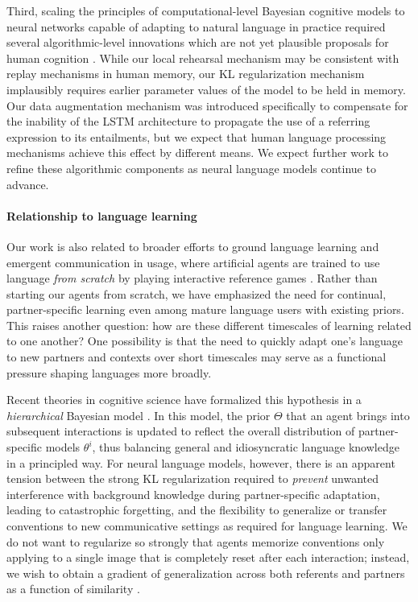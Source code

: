 \documentclass[11pt,a4paper]{article}
\begin{document}
Third, scaling the principles of computational-level Bayesian cognitive models to neural networks capable of adapting to natural language in practice required several algorithmic-level innovations which are not yet plausible proposals for human cognition \cite{marr2010vision}. 
While our local rehearsal mechanism may be consistent with replay mechanisms in human memory, our KL regularization mechanism implausibly requires earlier parameter values of the model to be held in memory.
Our data augmentation mechanism was introduced specifically to compensate for the inability of the LSTM architecture to propagate the use of a referring expression to its entailments, but we expect that human language processing mechanisms achieve this effect by different means.
We expect further work to refine these algorithmic components as neural language models continue to advance.

\paragraph{Relationship to language learning}

Our work is also related to broader efforts to ground language learning and emergent communication in usage, where artificial agents are trained to use language \emph{from scratch} by playing interactive reference games \cite{wang2016learning,lazaridou2016multi,wang2017naturalizing,chevalier2018babyai}. 
Rather than starting our agents from scratch, we have emphasized the need for continual, partner-specific learning even among mature language users with existing priors.
This raises another question: how are these different timescales of learning related to one another?
One possibility is that the need to quickly adapt one's language to new partners and contexts over short timescales may serve as a functional pressure shaping languages more broadly.

Recent theories in cognitive science have formalized this hypothesis in a \emph{hierarchical} Bayesian model \cite{hawkins2020generalizing}.
In this model, the prior $\Theta$ that an agent brings into subsequent interactions is updated to reflect the overall distribution of partner-specific models $\theta^i$, thus balancing general and idiosyncratic language knowledge in a principled way.
For neural language models, however, there is an apparent tension between the strong KL regularization required to \emph{prevent} unwanted interference with background knowledge during partner-specific adaptation, leading to catastrophic forgetting, and the flexibility to generalize or transfer conventions to new communicative settings as required for language learning.
We do not want to regularize so strongly that agents memorize conventions only applying to a single image that is completely reset after each interaction; instead, we wish to obtain a gradient of generalization across both referents and partners as a function of similarity \cite{markman1998referential}.
\end{document}
